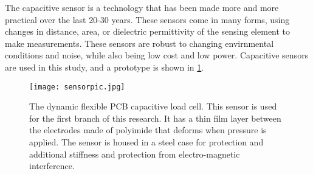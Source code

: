 The capacitive sensor is a technology that has been made more and more practical over the last 20-30 years.
These sensors come in many forms, using changes in distance, area, or dielectric permittivity of the sensing element
to make measurements. These sensors are robust to changing envirnmental conditions and noise, 
while also being low cost and low power.
Capacitive sensors are used in this study, and a prototype is shown in \ref{fig:flexcell}.

\begin{figure}[ht]
\centering
\texttt{[image: sensorpic.jpg]}
\caption{The dynamic flexible PCB capacitive load cell. 
This sensor is used for the first branch of this research.
It has a thin film layer between the electrodes made of polyimide 
that deforms when pressure is applied. The sensor is housed in a steel case for
protection and additional stiffness and protection from electro-magnetic interference.
}
\label{fig:flexcell}
\end{figure}
